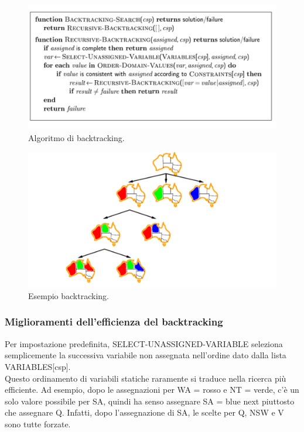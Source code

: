 \begin{figure}[htp]
    \centering
    \includegraphics[width=12cm, keepaspectratio]{img/Cap2/dfs.png}
    \caption{Algoritmo di backtracking.}
\end{figure}
\begin{figure}[htp]
    \centering
    \includegraphics[width=12cm, keepaspectratio]{img/Cap2/dfs2.png}
    \caption{Esempio backtracking.}
\end{figure}

\subsubsection{Miglioramenti dell'efficienza del backtracking}
Per impostazione predefinita, SELECT-UNASSIGNED-VARIABLE seleziona semplicemente
la successiva variabile non assegnata nell'ordine dato dalla lista
VARIABLES[csp]. \\Questo ordinamento di variabili statiche raramente si traduce
nella ricerca più efficiente. Ad esempio, dopo le assegnazioni per WA = rosso e
NT = verde, c'è un solo valore possibile per SA, quindi ha senso assegnare SA =
blue next piuttosto che assegnare Q. Infatti, dopo l'assegnazione di SA, le
scelte per Q, NSW e V sono tutte forzate.


